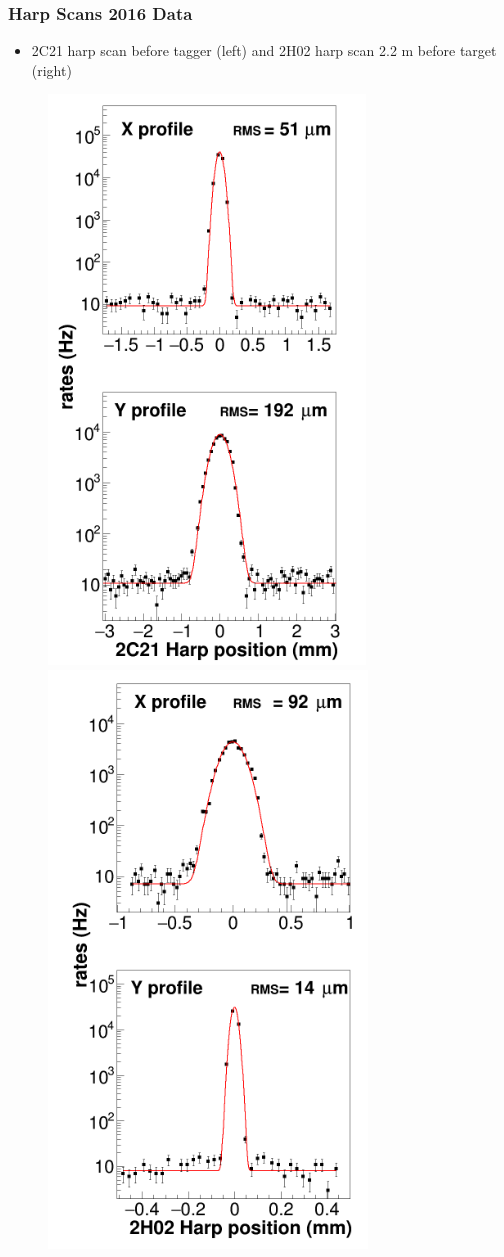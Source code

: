 \documentclass{beamer}
\begin{document}

\begin{frame}
\frametitle{Harp Scans 2016 Data}
\begin{itemize}
\item 2C21 harp scan before tagger (left) and 2H02 harp scan 2.2 m before target (right)
\end{itemize}
\begin{figure}
\includegraphics[width=0.30\linewidth]{figs/2C21_Harp.png}
\includegraphics[width=0.30\linewidth]{figs/2H02_harp.png}
\end{figure}

\end{frame}

\end{document}
